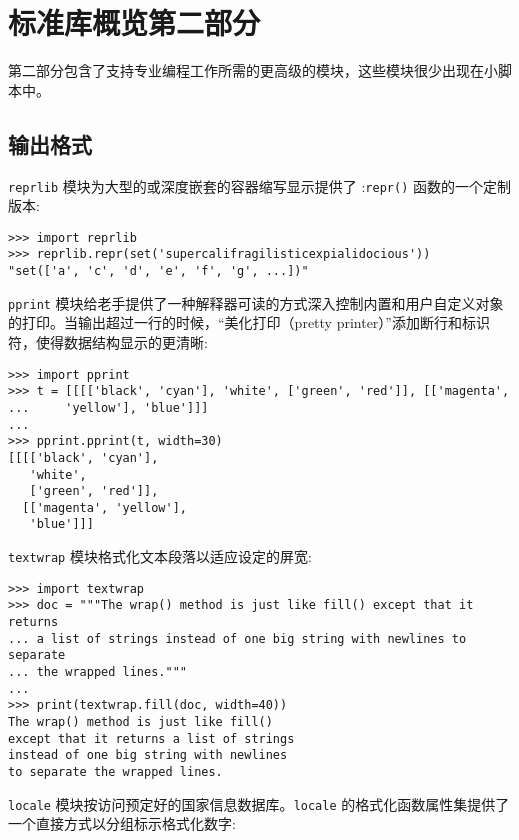 \chapter{标准库概览第二部分\label{LibPartII}}
第二部分包含了支持专业编程工作所需的更高级的模块，这些模块很少出现在小脚本中。
\section{输出格式}
\texttt{reprlib} 模块为大型的或深度嵌套的容器缩写显示提供了 :\texttt{repr()} 函数的一个定制版本:
\begin{lstlisting}
>>> import reprlib
>>> reprlib.repr(set('supercalifragilisticexpialidocious'))
"set(['a', 'c', 'd', 'e', 'f', 'g', ...])"
\end{lstlisting}
\texttt{pprint} 模块给老手提供了一种解释器可读的方式深入控制内置和用户自定义对象的打印。当输出超过一行的时候，“美化打印（pretty printer）”添加断行和标识符，使得数据结构显示的更清晰:
\begin{lstlisting}
>>> import pprint
>>> t = [[[['black', 'cyan'], 'white', ['green', 'red']], [['magenta',
...     'yellow'], 'blue']]]
...
>>> pprint.pprint(t, width=30)
[[[['black', 'cyan'],
   'white',
   ['green', 'red']],
  [['magenta', 'yellow'],
   'blue']]]
\end{lstlisting}
\texttt{textwrap} 模块格式化文本段落以适应设定的屏宽:
\begin{lstlisting}
>>> import textwrap
>>> doc = """The wrap() method is just like fill() except that it returns
... a list of strings instead of one big string with newlines to separate
... the wrapped lines."""
...
>>> print(textwrap.fill(doc, width=40))
The wrap() method is just like fill()
except that it returns a list of strings
instead of one big string with newlines
to separate the wrapped lines.
\end{lstlisting}
\texttt{locale} 模块按访问预定好的国家信息数据库。\texttt{locale} 的格式化函数属性集提供了一个直接方式以分组标示格式化数字:
